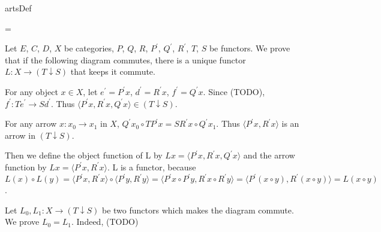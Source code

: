 \documentclass{article}
\newcounter{artCounter}
\newcounter{maxArts}
\newcommand{\showArt}{
\csname artsDef\roman{artCounter}\endcsname
\addtocounter{artCounter}{1}
\ifnum \value{artCounter}=\value{maxArts}
\setcounter{artCounter}{0}
\fi
}
\begin{document}
\showArt

Let $E$, $C$, $D$, $X$ be categories, $P$, $Q$, $R$, $P^\prime$, $Q^\prime$, $R^\prime$, $T$, $S$ be functors. We prove that if the following diagram commutes, there is a unique functor $L : X \rightarrow (T \downarrow S)$ that keeps it commute.

\begin{center}
\end{center}

For any object $x \in X$, let $e^\prime = P^\prime x$, $d^\prime = R^\prime x$, $f^\prime = Q^\prime x$. Since (TODO), $f^\prime : Te^\prime \rightarrow Sd^\prime$. Thus $\langle P^\prime x, R^\prime x, Q^\prime x \rangle \in (T \downarrow S)$.

For any arrow $x : x_0 \rightarrow x_1$ in $X$, $Q^\prime x_0 \circ TP^\prime x = SR^\prime x \circ Q^\prime x_1$. Thus $\langle P^\prime x, R^\prime x \rangle$ is an arrow in $(T \downarrow S)$.

Then we define the object function of L by $Lx = \langle P^\prime x, R^\prime x, Q^\prime x \rangle$ and the arrow function by $Lx = \langle P^\prime x, R^\prime x \rangle$. L is a functor, because $L(x) \circ L(y) = \langle P^\prime x, R^\prime x \rangle \circ \langle P^\prime y, R^\prime y \rangle = \langle P^\prime x \circ P^\prime y, R^\prime x \circ R^\prime y \rangle = \langle P^\prime (x \circ y), R^\prime (x \circ y) \rangle = L(x \circ y)$.

Let $L_0, L_1 : X \rightarrow (T \downarrow S)$ be two functors which makes the diagram commute. We prove $L_0 = L_1$. Indeed, (TODO)

\subsubsection{}

\subsection{}
\end{document}
